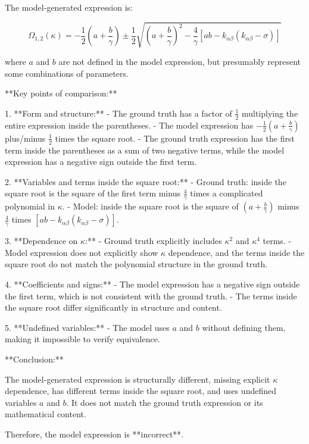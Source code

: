 \documentclass[10pt]{article}
\begin{document}
The model-generated expression is:

\[
\Omega_{1,2}(\kappa) = -\frac{1}{2} \left(a + \frac{b}{\gamma}\right) \pm \frac{1}{2} \sqrt{ \left(a + \frac{b}{\gamma}\right)^2 - \frac{4}{\gamma} \left[ a b - k_{\alpha\beta}(k_{\alpha\beta} - \sigma) \right] }
\]

where \(a\) and \(b\) are not defined in the model expression, but presumably represent some combinations of parameters.

**Key points of comparison:**

1. **Form and structure:**
   - The ground truth has a factor of \(\frac{1}{2}\) multiplying the entire expression inside the parentheses.
   - The model expression has \(-\frac{1}{2}(a + \frac{b}{\gamma})\) plus/minus \(\frac{1}{2}\) times the square root.
   - The ground truth expression has the first term inside the parentheses as a sum of two negative terms, while the model expression has a negative sign outside the first term.

2. **Variables and terms inside the square root:**
   - Ground truth: inside the square root is the square of the first term minus \(\frac{4}{\gamma}\) times a complicated polynomial in \(\kappa\).
   - Model: inside the square root is the square of \((a + \frac{b}{\gamma})\) minus \(\frac{4}{\gamma}\) times \([a b - k_{\alpha\beta}(k_{\alpha\beta} - \sigma)]\).

3. **Dependence on \(\kappa\):**
   - Ground truth explicitly includes \(\kappa^2\) and \(\kappa^4\) terms.
   - Model expression does not explicitly show \(\kappa\) dependence, and the terms inside the square root do not match the polynomial structure in the ground truth.

4. **Coefficients and signs:**
   - The model expression has a negative sign outside the first term, which is not consistent with the ground truth.
   - The terms inside the square root differ significantly in structure and content.

5. **Undefined variables:**
   - The model uses \(a\) and \(b\) without defining them, making it impossible to verify equivalence.

**Conclusion:**

The model-generated expression is structurally different, missing explicit \(\kappa\) dependence, has different terms inside the square root, and uses undefined variables \(a\) and \(b\). It does not match the ground truth expression or its mathematical content.

Therefore, the model expression is **incorrect**.
\end{document}
